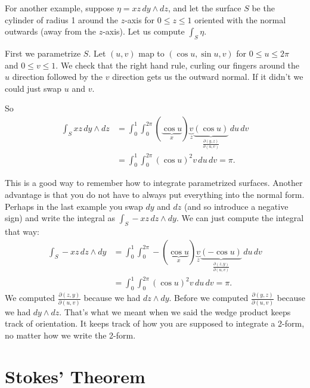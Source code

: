 \documentclass[12pt]{article}
\begin{document}
For another example, suppose $\eta = xz \, dy \wedge dz$,
and let the surface $S$ be the cylinder of radius 1 around the $z$-axis
for $0 \leq z \leq 1$ oriented with the normal outwards (away from the
$z$-axis).   Let us compute $\int_S \eta$.

First we parametrize $S$.  Let $(u,v)$ map to $(\cos u, \sin u, v)$
for $0 \leq u \leq 2\pi$ and $0 \leq v \leq 1$.  We check that the
right hand rule, curling our fingers around the $u$ direction followed by
the $v$ direction gets us the outward normal.  If it didn't we could just
swap $u$ and $v$.

So
\begin{equation*}
\begin{split}
\int_S xz \, dy \wedge dz
& =
\int_0^1
\int_0^{2\pi}
(\underbrace{\cos u}_{x}) \underbrace{v}_{z}
\underbrace{( \cos u )}_{\frac{\partial (y,z)}{\partial (u,v)}}
\, du \, dv
\\
& =
\int_0^1
\int_0^{2\pi}
{(\cos u)}^2 v \, du \, dv
= \pi .
\end{split}
\end{equation*}

This is a good way to remember how to integrate parametrized surfaces.
Another advantage is that you do not have to always put everything into the normal form.
Perhaps in the last example you swap $dy$ and $dz$ (and so introduce a negative sign)
and write the integral as $\int_S -xz \, dz \wedge dy$.  We can just compute the integral
that way:
\begin{equation*}
\begin{split}
\int_S -xz \, dz \wedge dy
& =
\int_0^1
\int_0^{2\pi}
- (\underbrace{\cos u}_{x}) \underbrace{v}_{z}
\underbrace{( - \cos u )}_{\frac{\partial (z,y)}{\partial (u,v)}}
\, du \, dv
\\
& =
\int_0^1
\int_0^{2\pi}
{(\cos u)}^2 v \, du \, dv
= \pi .
\end{split}
\end{equation*}
We computed
$\frac{\partial (z,y)}{\partial (u,v)}$ because we had $dz \wedge dy$.
Before we computed
$\frac{\partial (y,z)}{\partial (u,v)}$ because we had $dy \wedge dz$.
That's what we meant when we said the wedge product keeps track of orientation.  It keeps track
of how you are supposed to integrate a 2-form, no matter how we write the 2-form.

\section*{Stokes' Theorem}
\end{document}

